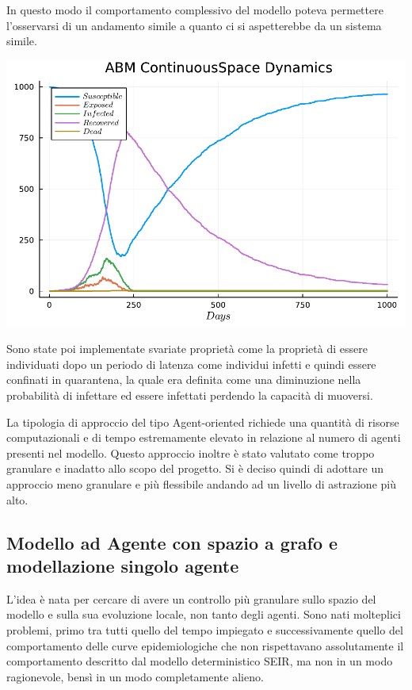 In questo modo il comportamento complessivo del modello poteva permettere l'osservarsi 
di un andamento simile a quanto ci si aspetterebbe da un sistema simile.

\begin{minipage}{\linewidth}
    \centering
    \includegraphics[width=\textwidth]{img/plot_abm_continuousspace.pdf}
    \label{fig:seir_curve_continuous}
\end{minipage}

Sono state poi implementate svariate proprietà come la proprietà di essere individuati 
dopo un periodo di latenza come individui infetti e quindi essere confinati in quarantena, 
la quale era definita come una diminuzione nella probabilità di infettare ed essere infettati 
perdendo la capacità di muoversi.

La tipologia di approccio del tipo Agent-oriented richiede una quantità di risorse computazionali 
e di tempo estremamente elevato in relazione al numero di agenti presenti nel modello. Questo approccio 
inoltre è stato valutato come troppo granulare e inadatto allo scopo del progetto. 
Si è deciso quindi di adottare un approccio meno granulare e più flessibile 
andando ad un livello di astrazione più alto.
\newpage

\subsection{Modello ad Agente con spazio a grafo e modellazione singolo agente}
L'idea è nata per cercare di avere un controllo più granulare sullo spazio del modello e sulla sua 
evoluzione locale, non tanto degli agenti. Sono nati molteplici problemi, primo tra tutti quello del tempo impiegato
e successivamente quello del comportamento delle curve epidemiologiche che non rispettavano 
assolutamente il comportamento descritto dal modello deterministico SEIR, ma non in un modo 
ragionevole, bensì in un modo completamente alieno. 

